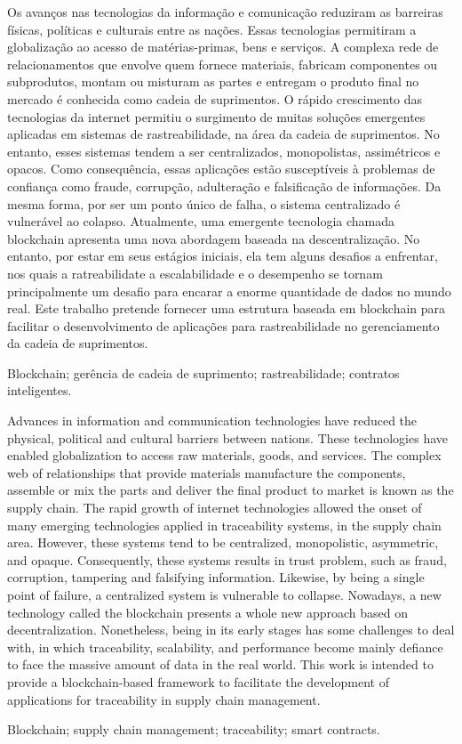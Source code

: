 
\resumo
Os avanços nas tecnologias da informação e comunicação reduziram as barreiras físicas, políticas e culturais entre as nações. Essas tecnologias permitiram a globalização ao acesso de matérias-primas, bens e serviços. A complexa rede de relacionamentos que envolve quem fornece materiais, fabricam componentes ou subprodutos, montam ou misturam as partes e entregam o produto final no mercado é conhecida como cadeia de suprimentos. O rápido crescimento das tecnologias da internet permitiu o surgimento de muitas soluções emergentes aplicadas em sistemas de rastreabilidade, na área da cadeia de suprimentos. No entanto, esses sistemas tendem a ser centralizados, monopolistas, assimétricos e opacos. Como consequência, essas aplicações estão susceptíveis à problemas de confiança como fraude, corrupção, adulteração e falsificação de informações. Da mesma forma, por ser um ponto único de falha, o sistema centralizado é vulnerável ao colapso. Atualmente, uma emergente tecnologia chamada blockchain apresenta uma nova abordagem baseada na descentralização. No entanto, por estar em seus estágios iniciais, ela tem alguns desafios a enfrentar, nos quais a ratreabilidate a escalabilidade e o desempenho se tornam principalmente um desafio para encarar a enorme quantidade de dados no mundo real. Este trabalho pretende fornecer uma estrutura baseada em blockchain para facilitar o desenvolvimento de aplicações para rastreabilidade no gerenciamento da cadeia de suprimentos.


\begin{keywords}
Blockchain; gerência de cadeia de suprimento; rastreabilidade; contratos inteligentes.
\end{keywords}


\abstract
Advances in information and communication technologies have reduced the physical, political and cultural barriers between nations. These technologies have enabled globalization to access raw materials, goods, and services. The complex web of relationships that provide materials manufacture the components, assemble or mix the parts and deliver the final product to market is known as the supply chain. The rapid growth of internet technologies allowed the onset of many emerging technologies applied in traceability systems, in the supply chain area. However, these systems tend to be centralized, monopolistic, asymmetric, and opaque. Consequently, these systems results in trust problem, such as fraud, corruption, tampering and falsifying information. Likewise, by being a single point of failure, a centralized system is vulnerable to collapse. Nowadays, a new technology called the blockchain presents a whole new approach based on decentralization. Nonetheless, being in its early stages has some challenges to deal with, in which traceability, scalability, and performance become mainly defiance to face the massive amount of data in the real world.  This work is intended to provide a blockchain-based framework to facilitate the development of applications for traceability in supply chain management.

\begin{keywords}
Blockchain; supply chain management; traceability; smart contracts.
\end{keywords}

